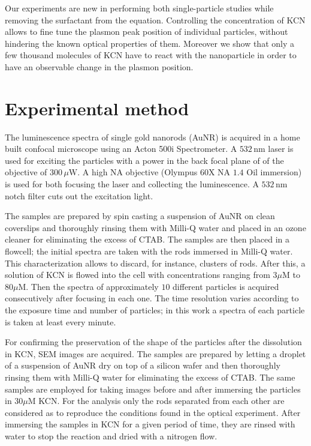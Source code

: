 \documentclass{article}
\begin{document}
Our experiments are new in performing both single-particle studies while
removing the surfactant from the equation. Controlling the concentration of KCN
allows to fine tune the plasmon peak position of individual particles, without
hindering the known optical properties of them. Moreover we show that only a few
thousand molecules of KCN have to react with the nanoparticle in order to have
an observable change in the plasmon position.

\section{Experimental method}
The luminescence spectra of single gold nanorods (AuNR) is acquired in a home
built confocal microscope using an Acton 500i Spectrometer. A $532\,\textrm{nm}$
laser is used for exciting the particles with a power in the back focal plane of
of the objective of $300\,\mu\textrm{W}$. A high NA objective (Olympus $60$X NA
$1.4$ Oil immersion) is used for both focusing the laser and collecting the
luminescence. A $532\,\textrm{nm}$ notch filter cuts out the excitation light.

The samples are prepared by spin casting a suspension of AuNR on clean
coverslips and thoroughly rinsing them  with Milli-Q water and placed in an
ozone cleaner for eliminating the excess of CTAB. The samples are then placed in
a flowcell; the initial spectra are taken with the rods immersed in Milli-Q
water. This characterization allows to discard, for instance, clusters of rods.
After this, a solution of KCN is flowed into the cell with concentrations
ranging from $3\mu\textrm{M}$ to $80\mu\textrm{M}$. Then the spectra of
approximately $10$ different particles is acquired consecutively after focusing
in each one. The time resolution varies according to the exposure time and
number of particles; in this work a spectra of each particle is taken at least
every minute.

For confirming the preservation of the shape of the particles after the
dissolution in KCN, SEM images are acquired. The samples are prepared by letting
a droplet of a suspension of AuNR dry on top of a silicon wafer and then
thoroughly rinsing them with Milli-Q water for eliminating the excess of CTAB.
The same samples are employed for taking images before and after immersing the
particles in $30\mu\textrm{M}$ KCN. For the analysis only the rods separated
from each other are considered as to reproduce the conditions found in the
optical experiment. After immersing the samples in KCN for a given period of
time, they are rinsed with water to stop the reaction and dried with a nitrogen
flow.
\end{document}
